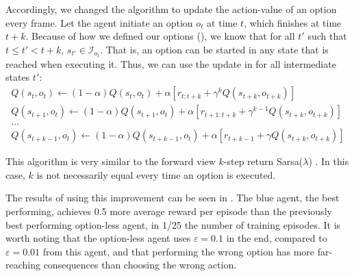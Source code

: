 Accordingly, we changed the algorithm to update the action-value of an option
every frame. Let the agent initiate an option $o_t$ at time $t$, which
finishes at time $t+k$. Because of how we defined our options
(), we know that for all $t'$ such that $t \leq t' < t+k$,
$s_{t'} \in \mathcal{I}_{o_t}$. That is, an option can be started in any state
that is reached when executing it. Thus, we can use the update in
 for all intermediate states $t'$:
\begin{equation}
  \begin{array}{c}
  Q(s_t, o_t) \gets (1-\alpha)Q(s_t, o_t) + \alpha \left[r_{t:t+k} + \gamma^k
Q(s_{t+k}, o_{t+k}) \right] \\
Q(s_{t+1}, o_t) \gets (1-\alpha)Q(s_{t+1}, o_t) + \alpha \left[r_{t+1:t+k} +
\gamma^{k-1} Q(s_{t+k}, o_{t+k}) \right] \\
\dots \\
Q(s_{t+k-1}, o_t) \gets (1-\alpha)Q(s_{t+k-1}, o_t) + \alpha \left[r_{t+k-1} +
\gamma Q(s_{t+k}, o_{t+k}) \right]
 \end{array}
\end{equation}

This algorithm is very similar to the forward view $k$-step return
Sarsa($\lambda$) \citep[Sections~7.1,~7.2,~7.5]{sutton1998introduction}. In this
case, $k$ is not necessarily equal every time an option is executed.

The results of using this improvement can be seen in
. The blue agent, the best performing,
achieves 0.5 more average reward per episode than the previously best performing
option-less agent, in 1/25 the number of training episodes. It is worth noting
that the option-less agent uses $\varepsilon=0.1$ in the end, compared to
$\varepsilon=0.01$ from this agent, and that performing the wrong option has
more far-reaching consequences than choosing the wrong action.


